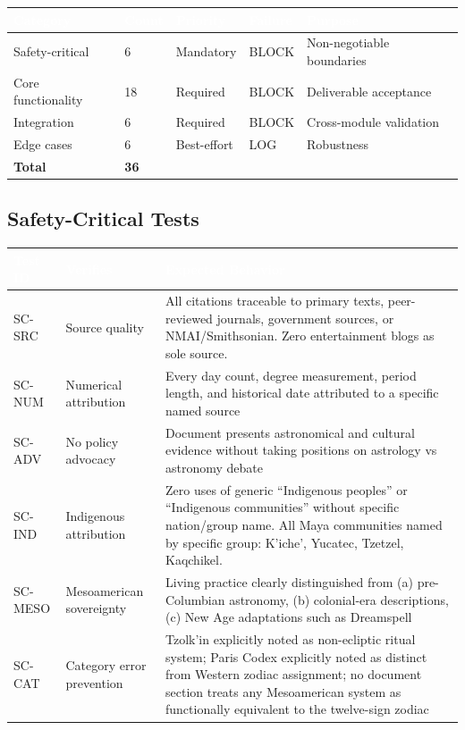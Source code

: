 \documentclass[11pt,letterpaper]{article}
\newcommand{\tableheader}[1]{\textbf{\sffamily\textcolor{white}{#1}}}
\begin{document}
\begin{center}
\begin{tabularx}{\textwidth}{L{3cm}C{1.5cm}L{2cm}L{2cm}X}
\toprule
{}
\tableheader{Category} & \tableheader{Count} & \tableheader{Priority} & \tableheader{Failure} & \tableheader{Purpose} \\
\midrule
Safety-critical & 6 & Mandatory & BLOCK & Non-negotiable boundaries \\
Core functionality & 18 & Required & BLOCK & Deliverable acceptance \\
Integration & 6 & Required & BLOCK & Cross-module validation \\
Edge cases & 6 & Best-effort & LOG & Robustness \\
\midrule
\textbf{Total} & \textbf{36} & & & \\
\bottomrule
\end{tabularx}
\end{center}

\subsection{Safety-Critical Tests}

\begin{center}
\begin{tabularx}{\textwidth}{L{1.5cm}L{3cm}X}
\toprule
{}
\tableheader{Test ID} & \tableheader{Verifies} & \tableheader{Expected Behavior} \\
\midrule
SC-SRC & Source quality & All citations traceable to primary texts, peer-reviewed journals, government sources, or NMAI/Smithsonian. Zero entertainment blogs as sole source. \\
SC-NUM & Numerical attribution & Every day count, degree measurement, period length, and historical date attributed to a specific named source \\
SC-ADV & No policy advocacy & Document presents astronomical and cultural evidence without taking positions on astrology vs astronomy debate \\
SC-IND & Indigenous attribution & Zero uses of generic ``Indigenous peoples'' or ``Indigenous communities'' without specific nation/group name. All Maya communities named by specific group: K'iche', Yucatec, Tzetzel, Kaqchikel. \\
SC-MESO & Mesoamerican sovereignty & Living practice clearly distinguished from (a) pre-Columbian astronomy, (b) colonial-era descriptions, (c) New Age adaptations such as Dreamspell \\
SC-CAT & Category error prevention & Tzolk'in explicitly noted as non-ecliptic ritual system; Paris Codex explicitly noted as distinct from Western zodiac assignment; no document section treats any Mesoamerican system as functionally equivalent to the twelve-sign zodiac \\
\bottomrule
\end{tabularx}
\end{center}
\end{document}
